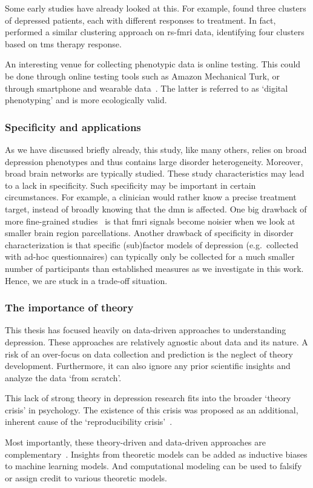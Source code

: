 Some early studies have already looked at this.
For example, \textcite{Chekroud2017} found three clusters of depressed patients, each with different responses to treatment.
In fact, \textcite{Drysdale2017} performed a similar clustering approach on \gls{rs-fmri} data, identifying four clusters based on \gls{tms} therapy response.

An interesting venue for collecting phenotypic data is online testing.
This could be done through online testing tools such as Amazon Mechanical Turk, or through smartphone and wearable data~\parencite[see e.g.][]{Shapiro2013, Brown2014b}.
The latter is referred to as `digital phenotyping' and is more ecologically valid.

\subsubsection{Specificity and applications}

As we have discussed briefly already, this study, like many others, relies on broad depression phenotypes and thus contains large disorder heterogeneity.
Moreover, broad brain networks are typically studied.
These study characteristics may lead to a lack in specificity.
Such specificity may be important in certain circumstances.
For example, a clinician would rather know a precise treatment target, instead of broadly knowing that the \gls{dmn} is affected.
One big drawback of more fine-grained studies~\parencite[e.g.][]{Klein-Flamp2022} is that \gls{fmri} signals become noisier when we look at smaller brain region parcellations.
Another drawback of specificity in disorder characterization is that specific (sub)factor models of depression (e.g.~collected with ad-hoc questionnaires) can typically only be collected for a much smaller number of participants than established measures as we investigate in this work.
Hence, we are stuck in a trade-off situation.

\subsubsection{The importance of theory}

This thesis has focused heavily on data-driven approaches to understanding depression.
These approaches are relatively agnostic about data and its nature.
A risk of an over-focus on data collection and prediction is the neglect of theory development.
Furthermore, it can also ignore any prior scientific insights and analyze the data `from scratch'.

This lack of strong theory in depression research fits into the broader `theory crisis' in psychology.
The existence of this crisis was proposed as an additional, inherent cause of the `reproducibility crisis'~\parencite{Oberauer2019, Eronen2021}.

Most importantly, these theory-driven and data-driven approaches are complementary~\parencite{Huys2016}.
Insights from theoretic models can be added as inductive biases to machine learning models.
And computational modeling can be used to falsify or assign credit to various theoretic models.
